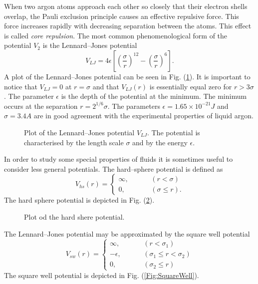 When two argon atoms approach each other so closely that their electron
shells overlap, the Pauli exclusion principle causes an effective repulsive
force. This force increases rapidly with decreasing separation between
the atoms. This effect is called \textit{core repulsion}. The most common
phenomenological form
of the potential $V_2$ is the Lennard--Jones potential
\begin{displaymath}
  V_{LJ} = 4 \epsilon \left[\left( \frac{\sigma}{r}\right)^{12}
                           - \left( \frac{\sigma}{r}\right)^6 \right]. 
\end{displaymath}
A plot of the Lennard--Jones potential can be seen in Fig. 
(\ref{Fig:LennardJones}).
It is important to notice that $V_{LJ}=0$ at $r= \sigma$ and that 
$V_{LJ}(r)$ is essentially equal zero for $r>3\sigma$. The parameter 
$\epsilon$ is the depth of the potential at the minimum. The minimum occurs at
the separation $r= 2^{1/6}\sigma$. The parameters
$\epsilon= 1.65 \times 10^{-21} J$ and $\sigma = 3.4 A$ are in good agreement
with the experimental properties of liquid argon.
 
\begin{figure}
\label{Fig:LennardJones}
\caption{Plot of the Lennard--Jones potential $V_{LJ}$. The potential is
  characterised by the length scale $\sigma$ and by the energy $\epsilon$.}
\end{figure}

In order to study some special properties of fluids it is sometimes useful to
consider less general potentials. The hard--sphere potential is defined as
\begin{displaymath}
  V_{hs}(r) = \left\{ 
                \begin{array}{ll}
                 \infty, &\hspace{1cm} (r<\sigma) \\
                 0, & \hspace{1cm} (\sigma \le r).
                \end{array}
             \right.
\end{displaymath}
The hard sphere potential is depicted in Fig. (\ref{Fig:HardSphere}).

\begin{figure}
\caption{Plot od the hard shere potential.}
\label{Fig:HardSphere}
\end{figure}

The Lennard--Jones potential may be approximated by the square well potential
\begin{displaymath}
  V_{sw}(r) = \left\{
              \begin{array}{ll}
                   \infty, & \hspace{1cm} (r < \sigma_1) \\
                    - \epsilon, & \hspace{1cm} (\sigma_1 \le r < \sigma_2) \\
                    0, & \hspace{1cm} (\sigma_2 \le r)  
               \end{array}
              \right. 
\end{displaymath}
The square well potential is depicted in Fig. (\ref{Fig:SquareWell}).

